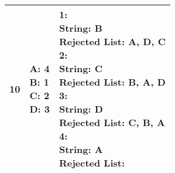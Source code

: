 \documentclass{article}
\begin{document}
\begin{center}
\begin{longtable}{ c|l|l }
        10 & \makecell{\textbf{A}: 4 \\ \textbf{B}: 1 \\ \textbf{C}: 2 \\ \textbf{D}: 3} &  
        \makecell{\textbf{1}:\\ \hspace{10mm} \textbf{String}: B \\ \hspace{10mm} \textbf{Rejected List}: A, D, C \\
                    \textbf{2}:\\ \hspace{10mm} \textbf{String}: C \\ \hspace{10mm} \textbf{Rejected List}: B, A, D \\
                    \textbf{3}:\\ \hspace{10mm} \textbf{String}: D \\ \hspace{10mm} \textbf{Rejected List}: C, B, A\\
                    \textbf{4}:\\ \hspace{10mm} \textbf{String}: A \\ \hspace{10mm} \textbf{Rejected List}: \\} \\
        \hline 

    \end{longtable}
\end{center}
\newpage
\end{document}
